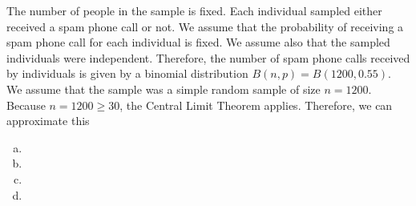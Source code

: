 \documentclass[11pt,letterpaper]{article}
\begin{document}
\sol The number of people in the sample is fixed. Each individual sampled either received a spam phone call or not. We assume that the probability of receiving a spam phone call for each individual is fixed. We assume also that the sampled individuals were independent. Therefore, the number of spam phone calls received by individuals is given by a binomial distribution $B(n, p)= B(1200, 0.55)$. We assume that the sample was a simple random sample of size $n= 1200$. Because $n= 1200 \geq 30$, the Central Limit Theorem applies. Therefore, we can approximate this 
\begin{enumerate}[(a)]
\item 
\item 
\item 
\item 
\end{enumerate}
\end{document}
